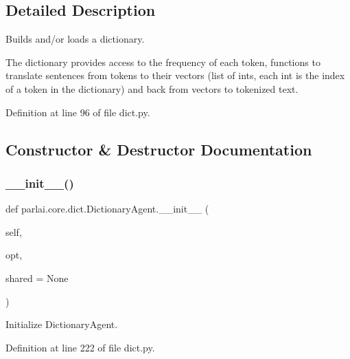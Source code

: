 \subsection{Detailed Description}
\begin{DoxyVerb}Builds and/or loads a dictionary.

The dictionary provides access to the frequency of each token, functions to
translate sentences from tokens to their vectors (list of ints, each int is the
index of a token in the dictionary) and back from vectors to tokenized text.
\end{DoxyVerb}
 

Definition at line 96 of file dict.\+py.



\subsection{Constructor \& Destructor Documentation}
\mbox{\label{classparlai_1_1core_1_1dict_1_1DictionaryAgent_a324531500b43e0039f2c0087081a8b3d}} 
\subsubsection{\texorpdfstring{\+\_\+\+\_\+init\+\_\+\+\_\+()}{\_\_init\_\_()}}
{\footnotesize\ttfamily def parlai.\+core.\+dict.\+Dictionary\+Agent.\+\_\+\+\_\+init\+\_\+\+\_\+ (\begin{DoxyParamCaption}\item[{}]{self,  }\item[{}]{opt,  }\item[{}]{shared = {\ttfamily None} }\end{DoxyParamCaption})}

\begin{DoxyVerb}Initialize DictionaryAgent.
\end{DoxyVerb}
 

Definition at line 222 of file dict.\+py.


